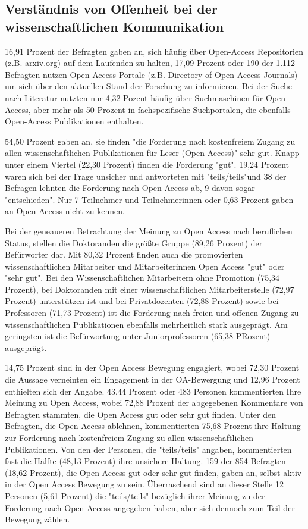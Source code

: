 \subsection{Verständnis von Offenheit bei der wissenschaftlichen Kommunikation}

16,91 Prozent der Befragten gaben an, sich häufig über Open-Access Repositorien (z.B. arxiv.org) auf dem Laufenden zu halten, 17,09 Prozent oder 190 der 1.112 Befragten nutzen Open-Access Portale (z.B. Directory of Open Access Journals) um sich über den aktuellen Stand der Forschung zu informieren. Bei der Suche nach Literatur nutzten nur 4,32 Pozent häufig über Suchmaschinen für Open Access, aber mehr als 50 Prozent in fachspezifische Suchportalen, die ebenfalls Open-Access Publikationen enthalten.

54,50 Prozent gaben an, sie finden "die Forderung nach kostenfreiem Zugang zu allen wissenschaftlichen Publikationen für Leser (Open Access)" sehr gut. Knapp unter einem Viertel (22,30 Prozent) finden die Forderung "gut". 19,24 Prozent waren sich bei der Frage unsicher und antworteten mit "teils/teils"und 38 der Befragen lehnten die Forderung nach Open Access ab, 9 davon sogar "entschieden". Nur 7 Teilnehmer und Teilnehmerinnen oder 0,63 Prozent gaben an Open Access nicht zu kennen.

Bei der geneaueren Betrachtung der Meinung zu Open Access nach beruflichen Status, stellen die Doktoranden die größte Gruppe (89,26 Prozent) der Befürworter dar. Mit 80,32 Prozent finden auch die promovierten wissenschaftlichen Mitarbeiter und Mitarbeiterinnen Open Access "gut" oder "sehr gut". Bei den Wissenschaftlichen Mitarbeitern ohne Promotion (75,34 Prozent), bei Doktoranden mit einer wissenschaftlichen Mitarbeiterstelle (72,97 Prozent) unterstützen ist und bei Privatdozenten (72,88 Prozent) sowie bei Professoren (71,73 Prozent) ist die Forderung nach freien und offenen Zugang zu wissenschaftlichen Publikationen ebenfalls mehrheitlich stark ausgeprägt.  Am geringsten ist die Befürwortung unter Juniorprofessoren (65,38 PRozent) ausgeprägt.

14,75 Prozent sind in der Open Access Bewegung engagiert, wobei 72,30 Prozent die Aussage verneinten ein Engagement in der OA-Bewergung und 12,96 Prozent enthielten sich der Angabe. 43,44 Prozent oder 483 Personen kommentierten Ihre Meinung zu Open Access, wobei 72,88 Prozent der abgegebenen Kommentare von Befragten stammten, die Open Access gut oder sehr gut finden. Unter den Befragten, die Open Access ablehnen, kommentierten 75,68 Prozent ihre Haltung zur Forderung nach kostenfreiem Zugang zu allen wissenschaftlichen Publikationen. Von den der Personen, die "teils/teils" angaben, kommentierten fast die Hälfte (48,13 Prozent) ihre unsichere Haltung. 159 der 854 Befragten (18,62 Prozent), die Open Access gut oder sehr gut finden, gaben an, selbst aktiv in der Open Access Bewegung zu sein. Überraschend sind an dieser Stelle 12 Personen (5,61 Prozent) die "teils/teils" bezüglich ihrer Meinung zu der Forderung nach Open Access angegeben haben, aber sich dennoch zum Teil der Bewegung zählen.

